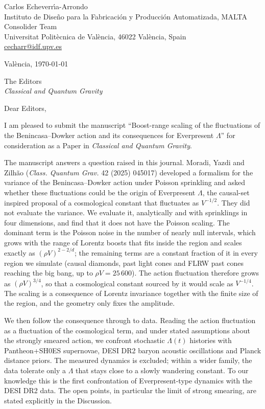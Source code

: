 \documentclass[11pt,a4paper]{article}
\begin{document}
\noindent Carlos Echeverr\'{\i}a-Arrondo\\
Instituto de Dise\~no para la Fabricaci\'on y Producci\'on Automatizada,
MALTA Consolider Team\\
Universitat Polit\`ecnica de Val\`encia, 46022 Val\`encia, Spain\\
\href{mailto:cecharr@idf.upv.es}{cecharr@idf.upv.es}

\vspace{1em}
\noindent Val\`encia, \today

\vspace{1em}
\noindent The Editors\\
\emph{Classical and Quantum Gravity}

\vspace{1.5em}
\noindent Dear Editors,

I am pleased to submit the manuscript ``Boost-range scaling of the
fluctuations of the Benincasa--Dowker action and its consequences for
Everpresent $\Lambda$'' for consideration as a Paper in \emph{Classical and
Quantum Gravity}.

The manuscript answers a question raised in this journal. Moradi, Yazdi and
Zilh\~ao (\emph{Class. Quantum Grav.} 42 (2025) 045017) developed a formalism
for the variance of the Benincasa--Dowker action under Poisson sprinkling and
asked whether these fluctuations could be the origin of Everpresent $\Lambda$,
the causal-set inspired proposal of a cosmological constant that fluctuates
as $V^{-1/2}$. They did not evaluate the variance. We evaluate it,
analytically and with sprinklings in four dimensions, and find that it does
not have the Poisson scaling. The dominant term is the Poisson noise in the
number of nearly null intervals, which grows with the range of Lorentz boosts
that fits inside the region and scales exactly as $(\rho V)^{2-2/d}$; the
remaining terms are a constant fraction of it in every region we simulate
(causal diamonds, past light cones and FLRW past cones reaching the big bang,
up to $\rho V=25\,600$). The action fluctuation therefore grows as
$(\rho V)^{3/4}$, so that a cosmological constant sourced by it would scale as
$V^{-1/4}$. The scaling is a consequence of Lorentz invariance together with
the finite size of the region, and the geometry only fixes the amplitude.

We then follow the consequence through to data. Reading the action
fluctuation as a fluctuation of the cosmological term, and under stated
assumptions about the strongly smeared action, we confront stochastic
$\Lambda(t)$ histories with Pantheon+SH0ES supernovae, DESI DR2 baryon
acoustic oscillations and Planck distance priors. The measured dynamics is
excluded; within a wider family, the data tolerate only a $\Lambda$ that stays
close to a slowly wandering constant. To our knowledge this is the first
confrontation of Everpresent-type dynamics with the DESI DR2 data. The open
points, in particular the limit of strong smearing, are stated explicitly in
the Discussion.
\end{document}
